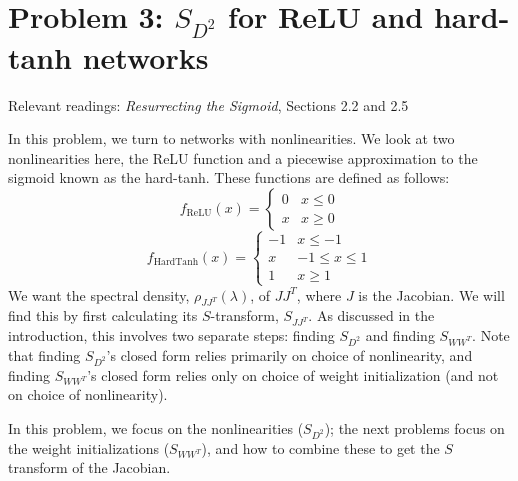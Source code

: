 \documentclass[a4paper]{article}
\begin{document}
\section*{Problem 3: $S_{D^2}$ for ReLU and hard-tanh networks}

Relevant readings: \textit{Resurrecting the Sigmoid}, Sections 2.2 and 2.5
\vspace{5}

In this problem, we turn to networks with nonlinearities. We look at two nonlinearities here, the ReLU function and a piecewise approximation to the sigmoid known as the hard-tanh.  These functions are defined as follows: 
\begin{equation}
    f_{\mathrm{ReLU}}(x) =  \begin{cases} 
      0 & x\leq 0 \\
      x & x\geq 0    \end{cases}
\end{equation}
\begin{equation}
    f_{\mathrm{HardTanh}}(x) =  \begin{cases} 
      -1 & x\leq -1 \\
      x & -1\leq x\leq 1 \\
      1 & x\geq 1
      \end{cases}
\end{equation}
We want the spectral density, $\rho_{JJ^T}(\lambda)$, of $JJ^T$, where $J$ is the Jacobian.  We will find this by first calculating its $S$-transform, $S_{JJ^T}$.  As discussed in the introduction, this involves two separate steps: finding  $S_{D^2}$ and finding $S_{WW^T}$. Note that finding $S_{D^2}$'s closed form relies primarily on choice of nonlinearity, and finding $S_{WW^T}$'s closed form relies only on choice of weight initialization (and not on choice of nonlinearity). 

In this problem, we focus on the nonlinearities ($S_{D^2}$); the next problems focus on the weight initializations ($S_{WW^T}$), and how to combine these to get the $S$ transform of the Jacobian.
\end{document}
